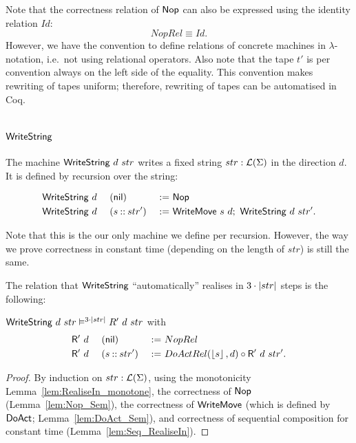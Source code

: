 Note that the correctness relation of $\mathsf{Nop}$ can also be expressed using the identity relation $Id$:
\[
  NopRel \equiv Id.
\]
However, we have the convention to define relations of concrete machines in $\lambda$-notation, i.e.\ not using relational operators.  Also note that
the tape $t'$ is per convention always on the left side of the equality.  This convention makes rewriting of tapes uniform; therefore, rewriting of
tapes can be automatised in Coq.

\section{$\MS{WriteString}$}
\label{sec:WriteString}

The machine $\mathsf{WriteString}~d~str$ writes a fixed string $str:\mathcal{L}(\Sigma)$ in the direction $d$.  It is defined by recursion over the string:
\begin{definition}[$\MS{WriteString}$]
  \begin{alignat*}{3}
    &\mathsf{WriteString}~d~&&(\mathsf{nil})         &~:=~& \mathsf{Nop} \\
    &\mathsf{WriteString}~d~&&(s \mathbin{::} str') &~:=~& \mathsf{WriteMove}~s~d ;~ \mathsf{WriteString}~d~str'.
  \end{alignat*}
\end{definition}

Note that this is the our only machine we define per recursion.  However, the way we prove correctness in constant time (depending on the length of
$str$) is still the same.

The relation that $\MS{WriteString}$ ``automatically'' realises in $3 \cdot \left| str \right|$ steps is the following:
\begin{lemma}
  $\mathsf{WriteString}~d~str \vDash^{3 \cdot \left| str \right|} R'~d~str$ with
  \begin{alignat*}{3}
    &\mathsf{R'}~d~&&(\mathsf{nil}        ) &~:=~& NopRel \\
    &\mathsf{R'}~d~&&(s \mathbin{::} str') &~:=~& DoActRel(\left\lfloor {s} \right\rfloor, d) \circ \mathsf{R'}~d~str'.
  \end{alignat*}
\end{lemma}
\begin{proof}
  By induction on $str:\mathcal{L}(\Sigma)$, using the monotonicity Lemma~\ref{lem:RealiseIn_monotone}, the correctness of $\mathsf{Nop}$ (Lemma~\ref{lem:Nop_Sem}),
  the correctness of $\mathsf{WriteMove}$ (which is defined by $\mathsf{DoAct}$; Lemma~\ref{lem:DoAct_Sem}), and correctness of sequential composition for
  constant time (Lemma~\ref{lem:Seq_RealiseIn}).
\end{proof}

